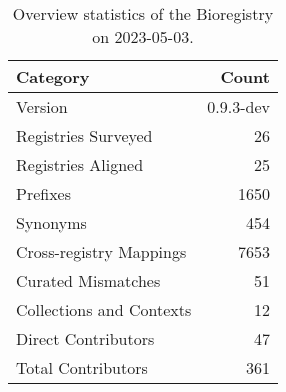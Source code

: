\begin{table}
\caption{Overview statistics of the Bioregistry on 2023-05-03.}
\label{tab:bioregistry-summary}
\begin{tabular}{lr}
\toprule
Category & Count \\
\midrule
Version & 0.9.3-dev \\
Registries Surveyed & 26 \\
Registries Aligned & 25 \\
Prefixes & 1650 \\
Synonyms & 454 \\
Cross-registry Mappings & 7653 \\
Curated Mismatches & 51 \\
Collections and Contexts & 12 \\
Direct Contributors & 47 \\
Total Contributors & 361 \\
\bottomrule
\end{tabular}
\end{table}
